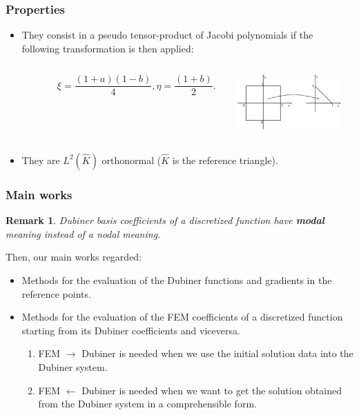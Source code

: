 \documentclass[8pt]{beamer}
\newtheorem*{remark}{Remark}
\begin{document}
\begin{frame}
\frametitle{Properties}
\begin{itemize}
	\item They consist in a pseudo tensor-product of Jacobi polynomials if the following transformation is then applied:
	\begin{columns}
		\begin{column}{0.5\textwidth}
			\begin{equation*}\label{transformation_formula}
			\quad \quad \quad \xi=\frac{(1+a)(1-b)}{4},  \eta=\frac{(1+b)}{2}.
			\end{equation*}
		\end{column}
		\begin{column}{0.5\textwidth}  
			\includegraphics[width = 4cm]{./transformation.png}
		\end{column}
	\end{columns}
    \item They are $L^2(\hat{K})$ orthonormal ($\hat{K}$ is the reference triangle).
\end{itemize}
\end{frame}


\begin{frame}
\frametitle{Main works}
\begin{remark}
	Dubiner basis coefficients of a discretized function have \textbf{modal} meaning instead of a \emph{nodal} meaning.
\end{remark}
Then, our main works regarded:
\begin{itemize}
	\item Methods for the evaluation of the Dubiner functions and gradients in the reference points.
	\item Methods for the evaluation of the FEM coefficients of a discretized function starting from its Dubiner coefficients and viceversa.
	\begin{enumerate}
		\item FEM $\rightarrow$ Dubiner is needed when we use the initial solution data into the Dubiner system.
		\item FEM $\leftarrow$ Dubiner is needed when we want to get the solution obtained from the Dubiner system in a comprehensible form. 
	\end{enumerate}
\end{itemize}
\end{frame}
\end{document}
